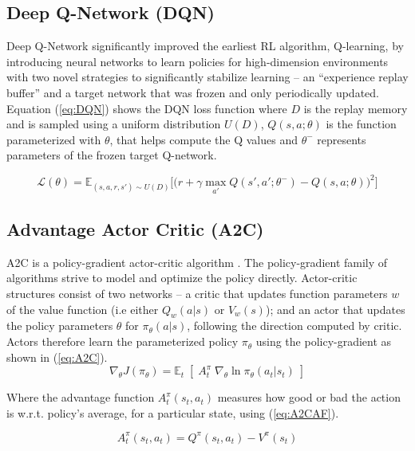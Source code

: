 \documentclass[a4paper, 12pt]{article}
\begin{document}
\subsection{Deep Q-Network (DQN)}
Deep Q-Network \citep{DQN-mnih2013} significantly improved the earliest RL algorithm, Q-learning, by introducing neural networks to learn policies for high-dimension environments with two novel strategies to significantly stabilize learning -- an ``experience replay buffer'' and a target network that was frozen and only periodically updated. Equation (\ref{eq:DQN}) shows the DQN loss function where $D$ is the replay memory and is sampled using a uniform distribution $U(D)$, $Q(s, a; \theta)$ is the function parameterized with $\theta$, that helps compute the Q values and $\theta^{-}$ represents parameters of the frozen target Q-network.

\begin{equation}
	\mathcal{L}(\theta) = \mathbb{E}_{(s, a, r, s') \sim U(D)} \Big[ \big( r + \gamma \max_{a'} Q(s', a'; \theta^{-}) - Q(s, a; \theta) \big)^2 \Big]
	\label{eq:DQN}
\end{equation}

\subsection{Advantage Actor Critic (A2C)}

A2C is a policy-gradient actor-critic algorithm \citep{A2C-mnih2016}. The policy-gradient family of algorithms strive to model and optimize the policy directly. Actor-critic structures consist of two networks -- a critic that updates function parameters $w$ of the value function (i.e either $Q_w(a \vert s)$ or $V_w(s)$); and an actor that updates the policy parameters $\theta$ for $\pi_\theta(a \vert s)$, following the direction computed by critic. Actors therefore learn the parameterized policy $\pi_{\theta}$ using the policy-gradient as shown in (\ref{eq:A2C}). 
\begin{equation}
	\nabla_ \theta J(\pi_\theta) = \mathbb{E}_t \; [ \; A^\pi_t \; \nabla_\theta \ln \pi_\theta(a_t \vert s_t) \;]
	\label{eq:A2C}
\end{equation}

Where the advantage function $A^\pi_t (s_t, a_t)$ measures how good or bad the action is w.r.t. policy's average, for a particular state, using (\ref{eq:A2CAF}).

\begin{equation}
	A^\pi_t (s_t, a_t) = Q^\pi (s_t, a_t) - V^\pi (s_t)
	\label{eq:A2CAF}
\end{equation}
\end{document}
